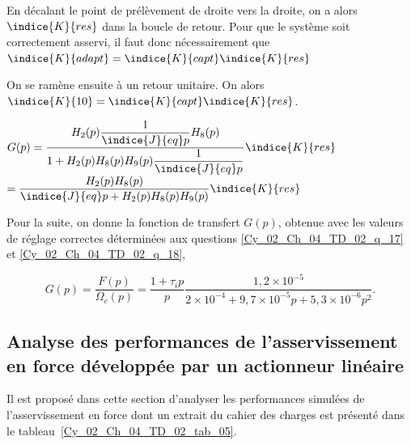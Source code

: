 \ifprof
\begin{corrige}
En décalant le point de prélèvement de droite vers la droite, on a alors $\indice{K}{res}$ dans la boucle de retour. 
Pour que le système soit correctement asservi, il faut donc nécessairement que 
$\indice{K}{adapt} = \indice{K}{capt}\indice{K}{res}$

On se ramène ensuite à un retour unitaire. On alors $\indice{K}{10} = \indice{K}{capt}\indice{K}{res}$.
\end{corrige}
\else
\fi

\ifprof
\begin{corrige}
$G(p)=\dfrac{H_2(p)\dfrac{1}{\indice{J}{eq}p}H_8(p)}{1+H_2(p)H_8(p)H_9(p)\dfrac{1}{\indice{J}{eq}p}}\indice{K}{res}$
$ = \dfrac{H_2(p)H_8(p)}{\indice{J}{eq}p+H_2(p)H_8(p)H_9(p)}\indice{K}{res}$
\end{corrige}
\else
\fi

Pour la suite, on donne la fonction de transfert $G(p)$, obtenue avec les valeurs de réglage correctes déterminées aux questions \ref{Cy_02_Ch_04_TD_02_q_17} et \ref{Cy_02_Ch_04_TD_02_q_18},

$$
G(p)=\frac{F(p)}{\Omega_{c}(p)}=\frac{1+\tau_{i} p}{p} \frac{1,2 \times 10^{-5}}{2 \times 10^{-4}+9,7 \times 10^{-5} p+5,3 \times 10^{-6} p^{2}} .
$$

\subsection*{Analyse des performances de l'asservissement en force développée par un actionneur linéaire}
\ifprof
\else
Il est proposé dans cette section d'analyser les performances simulées de l'asservissement en force dont un extrait du cahier des charges est présenté dans le tableau~\ref{Cy_02_Ch_04_TD_02_tab_05}.

